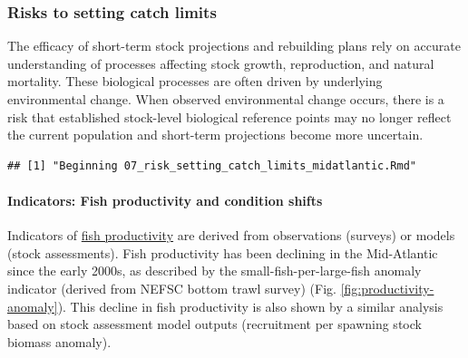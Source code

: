 \documentclass[
  10pt,
]{article}
\begin{document}
\subsubsection{Risks to setting catch limits}\label{risks-to-setting-catch-limits}

The efficacy of short-term stock projections and rebuilding plans rely on accurate understanding of processes affecting stock growth, reproduction, and natural mortality. These biological processes are often driven by underlying environmental change. When observed environmental change occurs, there is a risk that established stock-level biological reference points may no longer reflect the current population and short-term projections become more uncertain.

\begin{verbatim}
## [1] "Beginning 07_risk_setting_catch_limits_midatlantic.Rmd"
\end{verbatim}

\paragraph{Indicators: Fish productivity and condition shifts}\label{indicators-fish-productivity-and-condition-shifts}

Indicators of \href{https://noaa-edab.github.io/catalog/productivity_anomaly.html}{fish productivity} are derived from observations (surveys) or models (stock assessments). Fish productivity has been declining in the Mid-Atlantic since the early 2000s, as described by the small-fish-per-large-fish anomaly indicator (derived from NEFSC bottom trawl survey) (Fig. \ref{fig:productivity-anomaly}). This decline in fish productivity is also shown by a similar analysis based on stock assessment model outputs (recruitment per spawning stock biomass anomaly).
\end{document}
